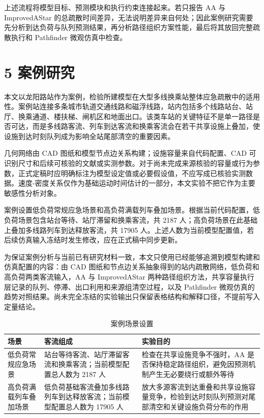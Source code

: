 \documentclass[UTF8,a4paper,12pt]{ctexart}
\begin{document}
上述流程将模型目标、预测模块和执行约束连接起来。若只报告 AA 与 ImprovedAStar 的总疏散时间差异，无法说明差异来自何处；因此案例研究需要先分析到达负荷与队列预测结果，再分析路径组织方案性能，最后将其放回完整疏散执行和 Pathfinder 微观仿真中检查。

\section{5 案例研究}

本文以龙阳路站作为案例，检验所建模型在大型多线换乘站整体应急疏散中的适用性。案例站连接多条城市轨道交通线路和磁浮线路，站内包括多个线路站台、站厅、换乘通道、楼扶梯、闸机区和地面出口。该类车站的关键特征不是单一路径是否可达，而是多线路客流、列车到达客流和换乘客流会在若干共享设施上叠加，使设施到达时刻队列成为影响全站尾部清空的重要因素。

几何网络由 CAD 图纸和模型节点边关系构建；设施容量来自代码配置、CAD 可识别尺寸和后续可核验的文献或实测参数。对于尚未完成来源核验的容量或行为参数，正式定稿时应明确标注为模型设定值或必要假设值，不应写成已核验实测数据。速度-密度关系仅作为基础运动时间估计的一部分，本文实验不把它作为主要敏感性分析对象。

案例设置低负荷常规应急场景和高负荷满载列车叠加场景。根据当前代码配置，低负荷场景包含站台等待、站厅滞留和换乘客流，共 2187 人；高负荷场景在此基础上叠加多线路列车到达释放客流，共 17905 人。上述人数为当前模型配置值，若后续仿真输入冻结时发生修改，应在正式稿中同步更新。

为保证案例分析与当前已有研究材料一致，本文只使用已经能够追溯到模型构建和仿真配置的内容：由 CAD 图纸和节点边关系抽象得到的站内疏散网络，低负荷和高负荷两类客流输入，AA 与 ImprovedAStar 两种路径组织方法，共享容量执行层记录的队列、停滞、出口利用和来源组清空过程，以及 Pathfinder 微观仿真的趋势对照结果。尚未完全冻结的实验输出只保留表格结构和解释口径，不提前写入定量结论。

\begin{table}[htbp]
\centering
\caption{案例场景设置}
\small
\begin{tabular}{p{}p{}p{}}
\toprule
场景 & 客流组成 & 实验目的 \\
\midrule
低负荷常规应急场景 & 站台等待客流、站厅滞留客流和换乘客流；当前模型配置总人数为 2187 人 & 检查在共享设施竞争不强时，AA 是否保持稳定路径组织，避免因预测机制产生无必要绕行或额外等待 \\
高负荷满载列车叠加场景 & 低负荷基础客流叠加多线路列车到达释放客流；当前模型配置总人数为 17905 人 & 放大多源客流到达重叠和共享设施容量竞争，检验到达时刻队列预测对尾部清空和关键设施负荷分布的作用 \\
\bottomrule
\end{tabular}
\end{table}
\end{document}
